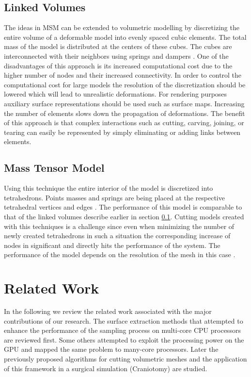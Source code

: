 \subsection{Linked Volumes}
\label{sec:linkedvolumes}
The ideas in MSM can be extended to volumetric modelling by discretizing the entire volume of a deformable model into evenly spaced cubic elements.
The total mass of the model is distributed at the centers of these cubes. The cubes are interconnected with their neighbors using springs and dampers
\cite{gibson1997simulating}. One of the disadvantages of this approach is its increased computational cost due to the higher number of nodes and
their increased connectivity. In order to control the computational cost for large models the resolution of the discretization should be lowered 
which will lead to unrealistic deformations. For rendering purposes auxiliary surface representations should be used such as surface maps. 
Increasing the number of elements slows down the propagation of deformations. The benefit of this approach is that complex interactions such as
cutting, carving, joining, or tearing can easily be represented by simply eliminating or adding links between elements.


\subsection{Mass Tensor Model}
Using this technique the entire interior of the model is discretized into tetrahedrons. Points masses and springs are 
being placed at the respective tetrahedral vertices and edges \cite{de1999modeling}. The performance of this model is comparable to that of the 
linked volumes describe earlier in section \ref{sec:linkedvolumes}. Cutting models created with this techniques is a challenge since even when
minimizing the number of newly created tetrahedrons in such a situation the corresponding increase of nodes in significant and directly hits the
performance of the system. The performance of the model depends on the resolution of the mesh in this case \cite{picinbono2000real}. 

\section{Related Work}
\label{sec:relatedwork}

In the following we review the related work associated with the major contributions of our research. 
The surface extraction methods that attempted to enhance the performance of the 
sampling process on multi-core CPU processors are reviewed first. Some others attempted to exploit the processing 
power on the GPU and mapped the same problem to many-core processors. Later 
the previously proposed algorithms for cutting volumetric meshes and the application of this framework 
in a surgical simulation (Craniotomy) are studied. 


